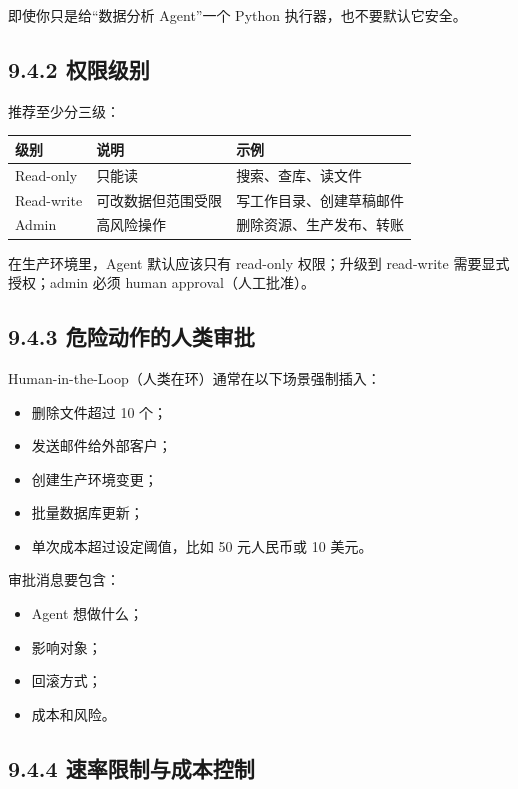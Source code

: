 即使你只是给``数据分析 Agent''一个 Python 执行器，也不要默认它安全。


\subsection{9.4.2 权限级别}

推荐至少分三级：


\begingroup
\scriptsize
\setlength{\tabcolsep}{3pt}
\begin{longtable}{|p{}|p{}|p{}|}
\hline
级别 & 说明 & 示例 \\ \hline
Read-only & 只能读 & 搜索、查库、读文件 \\ \hline
Read-write & 可改数据但范围受限 & 写工作目录、创建草稿邮件 \\ \hline
Admin & 高风险操作 & 删除资源、生产发布、转账 \\ \hline
\end{longtable}
\endgroup

在生产环境里，Agent 默认应该只有 read-only 权限；升级到 read-write 需要显式授权；admin 必须 human approval（人工批准）。


\subsection{9.4.3 危险动作的人类审批}

Human-in-the-Loop（人类在环）通常在以下场景强制插入：


\begin{itemize}[leftmargin=2em]
\item 删除文件超过 10 个；
\item 发送邮件给外部客户；
\item 创建生产环境变更；
\item 批量数据库更新；
\item 单次成本超过设定阈值，比如 50 元人民币或 10 美元。
\end{itemize}

审批消息要包含：


\begin{itemize}[leftmargin=2em]
\item Agent 想做什么；
\item 影响对象；
\item 回滚方式；
\item 成本和风险。
\end{itemize}

\subsection{9.4.4 速率限制与成本控制}

